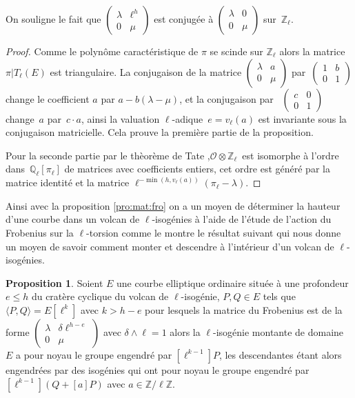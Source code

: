 \documentclass[10pt,a4paper]{book}
\theoremstyle{plain}
\theoremstyle{definition}
\theoremstyle{definition}
\theoremstyle{definition}
\newtheorem{prop}[thm]{Proposition}
\theoremstyle{definition}
\theoremstyle{remark}
\theoremstyle{remark}
\theoremstyle{definition}
\begin{document}
On souligne le fait que $\left(\begin{smallmatrix} \lambda & \ell^h \\ 0 &
\mu \end{smallmatrix}\right)$ est conjugée à $\left(\begin{smallmatrix} \lambda & 0 \\ 0 & \mu\end{smallmatrix}\right)$ sur~$\mathbb{Z}_{\ell}$.
\begin{proof}
Comme le polynôme caractéristique de $\pi$ se scinde sur $\mathbb{Z}_{\ell}$ 
alors la matrice $\pi|T_{\ell}(E)$ est triangulaire.
La conjugaison de la matrice $\left ( \begin{smallmatrix}\lambda & a\\0 & \mu
\end{smallmatrix}\right )$ par~$\left ( \begin{smallmatrix}1 & b\\0 & 1
\end{smallmatrix} \right )$ change le coefficient $a$ par $a-b (\lambda - \mu)$, 
et la conjugaison par ~$\left(\begin{smallmatrix} c & 0 \\ 0 &
1\end{smallmatrix}\right)$ change~$a$ par~$c \cdot a$,
ainsi la valuation $\ell$-adique~$e = v_{\ell}(a)$ est invariante sous la conjugaison matricielle.
Cela prouve la première partie de la proposition. 

Pour la seconde partie par le thèorème de Tate \cite[Isogeny theorem III.7.7 (a)]{Silv1},$\mathcal{O} \otimes \mathbb{Z}_{\ell}$~est isomorphe à l'ordre dans~$\mathbb{Q}_{\ell}[\pi_{\ell}]$
de matrices avec coefficients entiers, cet ordre est généré par la matrice identité et la matrice 
$\ell^{-\min (h, v_{\ell}(a))} (\pi_{\ell}-\lambda)$.
\end{proof}

Ainsi avec la proposition \ref{pro:mat:fro} on a un moyen de déterminer la hauteur d'une courbe dans un volcan de $\ell$-isogénies à l'aide de l'étude de l'action du Frobenius sur la $\ell$-torsion comme le montre le résultat suivant qui nous donne un moyen de savoir comment monter et descendre à l'intérieur d'un volcan de $\ell$-isogénies.

\begin{prop}
\label{pro:tri:dir}
Soient $E$ une courbe elliptique ordinaire située à une profondeur $e \leqslant h$ du cratère cyclique du volcan de $\ell$-isogénie, $P,Q \in E$ tels que $\langle P,Q \rangle = E[\ell^k]$ avec $k>h-e$ pour lesquels la matrice du Frobenius est de la forme $\left( \begin{smallmatrix} \lambda & \delta \ell^{h-e} \\ 0 & \mu \end{smallmatrix} \right)$ avec $\delta \wedge \ell=1$ alors la $\ell$-isogénie montante de domaine $E$ a pour noyau le groupe engendré par  $[\ell^{k-1}]P$, les descendantes étant alors engendrées par des isogénies qui ont pour noyau le groupe engendré par $[\ell^{k-1}](Q+[a]P)$ avec $a \in \mathbb{Z}/\ell \mathbb{Z}$.
\end{prop}
\end{document}
